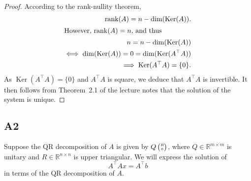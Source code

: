 \documentclass[11pt]{article}
\DeclareMathOperator{\rank}{rank}
\DeclareMathOperator{\Ker}{Ker}
\newcommand{\real}{\mathbb{R}} %
\begin{document}
\begin{proof}
	According to the rank-nullity theorem,
	\begin{align*}
	\rank(A) = n - \dim(\Ker(A)). \\
	\intertext{However, \(\rank(A) = n\), and thus}
	n = n - \dim(\Ker(A)) \\
	\iff \dim(\Ker(A))= 0 = \dim(\Ker(A^\top A)) \\
	\implies \Ker(A^\top A) = \{0\}.
	\end{align*}
	As $\Ker(A^\top A)=\{0\}$ and $A^\top A$ is square, we deduce that $A^\top A$ is invertible. It then follows from Theorem~2.1 of the lecture notes that the solution of the system is unique.
\end{proof}

\subsection*{A2}
Suppose the QR decomposition of $A$ is given by $\tiny{Q \begin{pmatrix}R\\0\end{pmatrix}}$, where $Q \in \real^{m\times m}$ is unitary and $R \in \real^{n\times n}$ is upper triangular. We will express the solution of 
\begin{equation}\label{eqA2}
A^\top Ax=A^\top b
\end{equation} in terms of the QR decomposition of \(A\).
\end{document}
